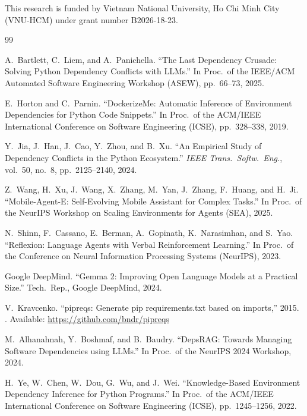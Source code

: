 \documentclass[sigconf,screen]{acmart}
\begin{document}
\begin{acks}
This research is funded by Vietnam National University, Ho Chi Minh City (VNU-HCM) under grant number B2026-18-23.

\end{acks}


\begin{thebibliography}{99}

A.~Bartlett, C.~Liem, and A.~Panichella.
\newblock ``The Last Dependency Crusade: Solving Python Dependency Conflicts with LLMs.''
\newblock In Proc.\ of the IEEE/ACM Automated Software Engineering Workshop (ASEW), pp.~66--73, 2025.

E.~Horton and C.~Parnin.
\newblock ``DockerizeMe: Automatic Inference of Environment Dependencies for Python Code Snippets.''
\newblock In Proc.\ of the ACM/IEEE International Conference on Software Engineering (ICSE), pp.~328--338, 2019.

Y.~Jia, J.~Han, J.~Cao, Y.~Zhou, and B.~Xu.
\newblock ``An Empirical Study of Dependency Conflicts in the Python Ecosystem.''
\newblock \emph{IEEE Trans.\ Softw.\ Eng.}, vol.~50, no.~8, pp.~2125--2140, 2024.

Z.~Wang, H.~Xu, J.~Wang, X.~Zhang, M.~Yan, J.~Zhang, F.~Huang, and H.~Ji.
\newblock ``Mobile-Agent-E: Self-Evolving Mobile Assistant for Complex Tasks.''
\newblock In Proc.\ of the NeurIPS Workshop on Scaling Environments for Agents (SEA), 2025.

N.~Shinn, F.~Cassano, E.~Berman, A.~Gopinath, K.~Narasimhan, and S.~Yao.
\newblock ``Reflexion: Language Agents with Verbal Reinforcement Learning.''
\newblock In Proc.\ of the Conference on Neural Information Processing Systems (NeurIPS), 2023.

Google DeepMind.
\newblock ``Gemma 2: Improving Open Language Models at a Practical Size.''
\newblock Tech.\ Rep., Google DeepMind, 2024.

V.~Kravcenko.
\newblock ``pipreqs: Generate pip requirements.txt based on imports,'' 2015.
\newblock [Online]. Available: \url{https://github.com/bndr/pipreqs}

M.~Alhanahnah, Y.~Boshmaf, and B.~Baudry.
\newblock ``DepsRAG: Towards Managing Software Dependencies using LLMs.''
\newblock In Proc.\ of the NeurIPS 2024 Workshop, 2024.

H.~Ye, W.~Chen, W.~Dou, G.~Wu, and J.~Wei.
\newblock ``Knowledge-Based Environment Dependency Inference for Python Programs.''
\newblock In Proc.\ of the ACM/IEEE International Conference on Software Engineering (ICSE), pp.~1245--1256, 2022.


\end{thebibliography}
\end{document}
